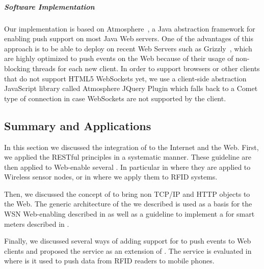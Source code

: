 

\subparagraph{Software Implementation}
Our implementation is based on Atmosphere~, a Java abstraction framework for enabling push support on most Java Web servers. One of the advantages of this approach is to be able to deploy \tpusher{} on recent Web Servers such as Grizzly~, which are highly optimized to push events on the Web because of their usage of non-blocking threads for each new client. In order to support browsers or other clients that do not support HTML5 WebSockets yet, we use a client-side abstraction JavaScript library called Atmosphere JQuery Plugin which falls back to a Comet type of connection in case WebSockets are not supported by the client.

\subsection{Summary and Applications}
In this section we discussed the integration of \sts{} to the Internet and the Web. First, we applied the RESTful principles in a systematic manner. These guideline are then applied to Web-enable several \sts{}. In particular in  where they are applied to Wireless sensor nodes, or in  where we apply them to RFID systems.

Then, we discussed the concept of \sgs{} to bring non TCP/IP and HTTP objects to the Web. The generic architecture of the \sg{} we described is used as a basis for the WSN Web-enabling described in  as well as a guideline to implement a \sg{} for smart meters described in .

Finally, we discussed several ways of adding support for \sts{} to push events to Web clients and proposed the \tpusher{} service as an extension of \sgs{}. The \tpusher{} service is evaluated in  where is it used to push data from RFID readers to mobile phones.
